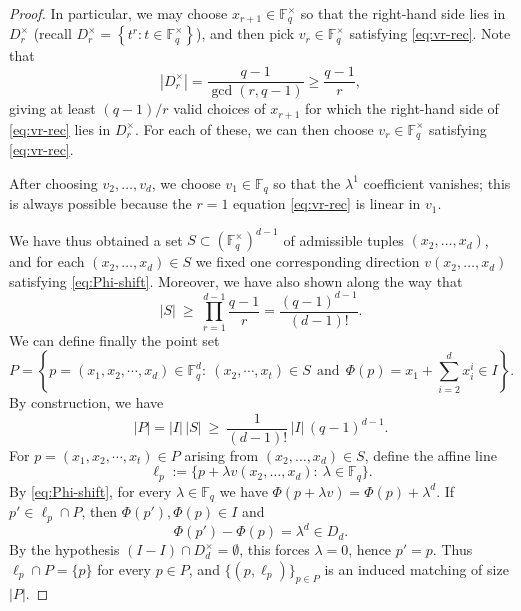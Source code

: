\documentclass[10pt,a4paper]{amsart}
\newcommand{\F}{\mathbb{F}}
\newcommand{\abs}[1]{\left|#1\right|}
\begin{document}
\begin{proof}
In particular, we may choose $x_{r+1}\in\F_q^{\times}$ so that the right-hand side lies in $D_{r}^{\times}$ (recall $D_{r}^{\times}=\left\{t^r:t\in\F_q^\times\right\}$),
and then pick $v_r\in\F_q^\times$ satisfying \eqref{eq:vr-rec}.
Note that
$$\abs{D_r^{\times}} = \frac{q-1}{\gcd(r,q-1)} \geq \frac{q - 1}{r},$$
giving at least $(q-1)/r$ valid choices of $x_{r+1}$ for which the right-hand side
of \eqref{eq:vr-rec} lies in $D_{r}^{\times}$. For each of these, we can then choose $v_r\in\F_q^\times$ satisfying \eqref{eq:vr-rec}. 

After choosing $v_2,\dots,v_d$, we choose $v_1\in\F_q$ so that the $\lambda^1$ coefficient vanishes;
this is always possible because the $r=1$ equation \eqref{eq:vr-rec} is linear in $v_1$.

We have thus obtained a set $S\subset(\F_q^\times)^{d-1}$ of admissible tuples $(x_2,\dots,x_d)$, and for each $(x_2,\dots,x_d)\in S$ we fixed one corresponding direction $v(x_2,\dots,x_d)$ satisfying \eqref{eq:Phi-shift}. Moreover, we have also shown along the way that
$$|S|\ \ge\ \prod_{r=1}^{d-1}\frac{q-1}{r} = \frac{(q-1)^{d-1}}{(d-1)!}.$$
We can define finally the point set
$$P = \left\{p=(x_1, x_2, \cdots, x_d) \in \mathbb{F}_{q}^{d}:\ (x_2, \cdots, x_t) \in S\ \ \text{and}\ \ \Phi(p) = x_1 + \sum_{i=2}^d x_i^i \in I\right\}.$$
By construction, we have
\[
  |P|=|I|\,|S|\ \ge\ \frac{1}{(d-1)!}\,|I|\,(q-1)^{d-1}.
\]
For $p = (x_1, x_2, \cdots, x_t) \in P$ arising from $(x_2,\dots,x_d)\in S$, define the affine line
\[
  \ell_p:=\{p+\lambda v(x_2,\dots,x_d):\ \lambda\in\F_q\}.
\]
By \eqref{eq:Phi-shift}, for every $\lambda\in\F_q$ we have
$\Phi(p+\lambda v)=\Phi(p)+\lambda^d$.
If $p'\in \ell_p\cap P$, then $\Phi(p'),\Phi(p)\in I$ and
\[
  \Phi(p')-\Phi(p)=\lambda^d\in D_d.
\]
By the hypothesis $(I-I)\cap D_d^\times=\emptyset$, this forces $\lambda=0$, hence $p'=p$.
Thus $\ell_p\cap P=\{p\}$ for every $p\in P$, and $\{(p,\ell_p)\}_{p\in P}$ is an induced matching of size $|P|$.
\end{proof}
\end{document}
